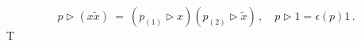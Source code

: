 \begin{equation} p\triangleright
(x\tilde{x}) \ = \ (p_{(1)}\triangleright x) (p_{(2)}
\triangleright \tilde{x})\, ,\quad p\triangleright 1=\epsilon(p)
1\, .\label{r316}\end{equation}T
